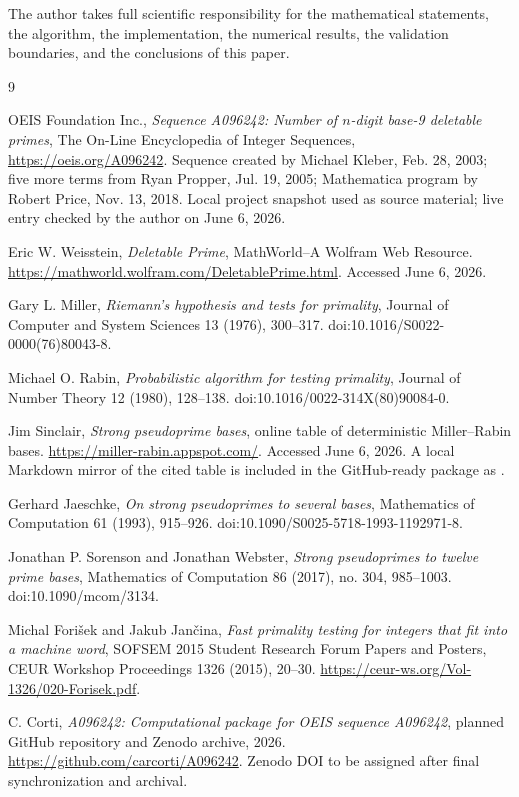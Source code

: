 \documentclass[11pt]{article}
\theoremstyle{definition}
\theoremstyle{remark}
\begin{document}
The author takes full scientific responsibility for the mathematical
statements, the algorithm, the implementation, the numerical results, the
validation boundaries, and the conclusions of this paper.

\begin{thebibliography}{9}
\sloppy
\raggedright

OEIS Foundation Inc.,
\emph{Sequence A096242: Number of \(n\)-digit base-9 deletable primes},
The On-Line Encyclopedia of Integer Sequences,
\url{https://oeis.org/A096242}.
Sequence created by Michael Kleber, Feb. 28, 2003; five more terms from
Ryan Propper, Jul. 19, 2005; Mathematica program by Robert Price,
Nov. 13, 2018.  Local project snapshot used as source material; live entry
checked by the author on June 6, 2026.

Eric W. Weisstein,
\emph{Deletable Prime},
MathWorld--A Wolfram Web Resource.
\url{https://mathworld.wolfram.com/DeletablePrime.html}.
Accessed June 6, 2026.

Gary L. Miller,
\emph{Riemann's hypothesis and tests for primality},
Journal of Computer and System Sciences 13 (1976), 300--317.
doi:10.1016/S0022-0000(76)80043-8.

Michael O. Rabin,
\emph{Probabilistic algorithm for testing primality},
Journal of Number Theory 12 (1980), 128--138.
doi:10.1016/0022-314X(80)90084-0.

Jim Sinclair,
\emph{Strong pseudoprime bases},
online table of deterministic Miller--Rabin bases.
\url{https://miller-rabin.appspot.com/}.
Accessed June 6, 2026.  A local Markdown mirror of the cited table is
included in the GitHub-ready package as
.

Gerhard Jaeschke,
\emph{On strong pseudoprimes to several bases},
Mathematics of Computation 61 (1993), 915--926.
doi:10.1090/S0025-5718-1993-1192971-8.

Jonathan P. Sorenson and Jonathan Webster,
\emph{Strong pseudoprimes to twelve prime bases},
Mathematics of Computation 86 (2017), no. 304, 985--1003.
doi:10.1090/mcom/3134.

Michal Fori\v{s}ek and Jakub Jan\v{c}ina,
\emph{Fast primality testing for integers that fit into a machine word},
SOFSEM 2015 Student Research Forum Papers and Posters, CEUR Workshop
Proceedings 1326 (2015), 20--30.
\url{https://ceur-ws.org/Vol-1326/020-Forisek.pdf}.

C. Corti,
\emph{A096242: Computational package for OEIS sequence A096242},
planned GitHub repository and Zenodo archive, 2026.
\url{https://github.com/carcorti/A096242}.
Zenodo DOI to be assigned after final synchronization and archival.

\end{thebibliography}
\end{document}
